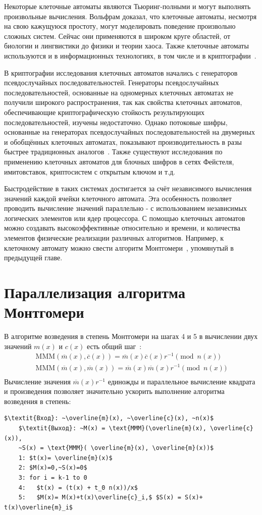 \documentclass[times,specification,annotation]{itmo-student-thesis}
\begin{document}
Некоторые клеточные автоматы являются Тьюринг-полными и могут выполнять произвольные вычисления.
Вольфрам доказал, что клеточные автоматы, несмотря на свою кажущуюся простоту, могут моделировать поведение произвольно сложных систем.
Сейчас они применяются в широком круге областей, от биологии и лингвистики до физики и теории хаоса.
Также клеточные автоматы используются и в информационных технологиях, в том числе и в криптографии~\cite{zhu17}.

В криптографии исследования клеточных автоматов начались с генераторов псевдослучайных последовательностей.
Генераторы псевдослучайных последовательностей, основанные на одномерных клеточных автоматах не получили широкого распространения,
так как свойства клеточных автоматов, обеспечивающие криптографическую стойкость результирующих последовательностей,
изучены недостаточно.
Однако потоковые шифры, основанные на генераторах псевдослучайных последовательностей на двумерных и обобщённых
клеточных автоматах, показывают производительность в разы быстрее традиционных аналогов~\cite{zhu17_2}.
Также существуют исследования по применению клеточных автоматов для блочных шифров в сетях Фейстеля, имитовставок,
криптосистем с открытым ключом и т.д.

Быстродействие в таких системах достигается за счёт независимого вычисления значений каждой ячейки клеточного автомата.
Эта особенность позволяет проводить вычисление значений параллельно - с использованием независимых логических элементов или ядер процессора.
С помощью клеточных автоматов можно создавать высокоэффективные относительно и времени, и количества элементов физические реализации различных алгоритмов.
Например, к клеточному автомату можно свести алгоритм Монтгомери~\cite{jeo07}, упомянутый в предыдущей главе.

\section{Параллелизация алгоритма Монтгомери}\label{sec:paramont}

В алгоритме возведения в степень Монтгомери на шагах 4 и 5 в вычислении двух значений
$m(x)$ и $c(x)$ есть общий шаг~\cite{ku04}:
\begin{gather*}
  \text{MMM}(\overline{m}(x), \overline{c}(x)) = \overline{m}(x)\overline{c}(x)r^{-1} \pmod{n(x)}\\
  \text{MMM}(\overline{m}(x), \overline{m}(x)) = \overline{m}(x)\overline{m}(x)r^{-1} \pmod{n(x)}\\
\end{gather*}
Вычисление значения $\overline{m}(x)r^{-1}$ единожды и параллельное вычисление квадрата и произведения
позволяет значительно ускорить выполнение алгоритма возведения в степень:
\begin{lstlisting}[breaklines=true, mathescape=true]
    $\textit{Вход}: ~\overline{m}(x), ~\overline{c}(x), ~n(x)$
    $\textit{Выход}: ~M(x) = \text{MMM}(\overline{m}(x), \overline{c}(x)),
    ~S(x) = \text{MMM}( \overline{m}(x), \overline{m}(x))$
    1: $t(x)= \overline{m}(x)$
    2: $M(x)=0,~S(x)=0$
    3: for i = k-1 to 0
    4:   $t(x) = (t(x) + t_0 n(x))/x$
    5:   $M(x)= M(x)+t(x)\overline{c}_i,$ $S(x) = S(x)+ t(x)\overline{m}_i$
\end{lstlisting}
\end{document}
